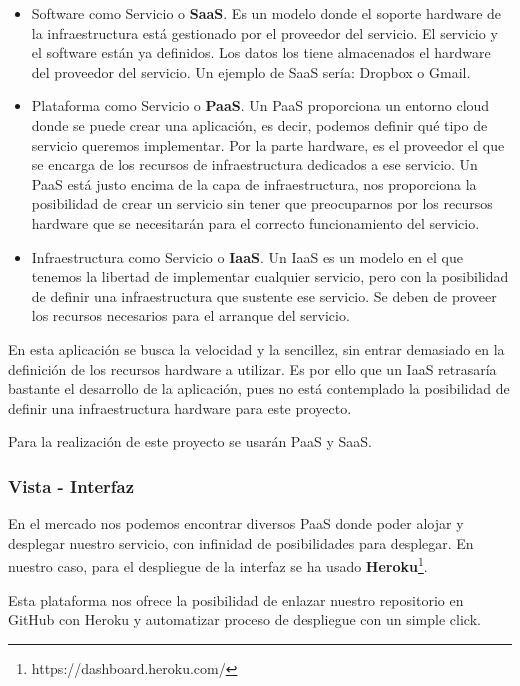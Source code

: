 \begin{itemize}
    \item Software como Servicio o \textbf{SaaS}. Es un modelo donde el soporte hardware de la infraestructura está gestionado por el proveedor del servicio. El servicio y el software están ya definidos. Los datos los tiene almacenados el  hardware del proveedor del servicio. Un ejemplo de SaaS sería: Dropbox o Gmail.
    \item Plataforma como Servicio o \textbf{PaaS}. Un PaaS proporciona un entorno cloud donde se puede crear una aplicación, es decir, podemos definir qué tipo de servicio queremos implementar. Por la parte hardware, es el proveedor el que se encarga de los recursos de infraestructura dedicados a ese servicio. Un PaaS está justo encima de la capa de infraestructura, nos proporciona la posibilidad de crear un servicio sin tener que preocuparnos por los recursos hardware que se necesitarán para el correcto funcionamiento del servicio.
    \item Infraestructura como Servicio o \textbf{IaaS}. Un IaaS es un modelo en el que tenemos la libertad de implementar cualquier servicio, pero con la posibilidad de definir una infraestructura que sustente ese servicio. Se deben de proveer los recursos necesarios para el arranque del servicio.
\end{itemize}

En esta aplicación se busca la velocidad y la sencillez, sin entrar demasiado en la definición de los recursos hardware a utilizar. Es por ello que un IaaS retrasaría bastante el desarrollo de la aplicación, pues no está contemplado la posibilidad de definir una infraestructura hardware para este proyecto.

Para la realización de este proyecto se usarán PaaS y SaaS.

\subsubsection{Vista - Interfaz}

En el mercado nos podemos encontrar diversos PaaS donde poder alojar y desplegar nuestro servicio, con infinidad de posibilidades para desplegar. En nuestro caso, para  el despliegue de la interfaz se ha usado \textbf{Heroku}\footnote{https://dashboard.heroku.com/}.

Esta plataforma nos ofrece la posibilidad de enlazar nuestro repositorio en GitHub con Heroku y automatizar proceso de despliegue con un simple click.

